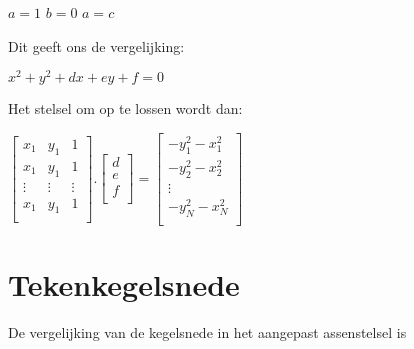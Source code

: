 \documentclass[]{article}
\begin{document}
 \begin{center}
 $ a = 1$	   \quad \quad \quad      	$b = 0$    \quad \quad \quad   	$a = c$
 \end{center}
 
 \noindent Dit geeft ons de vergelijking:
 
 \begin{center}
  $x^2 + y^2 + dx +  ey + f = 0$
  \end{center}
  
  \noindent Het stelsel om op te lossen wordt dan:
   
   \begin{center}
   $
   \begin{bmatrix}
    x_{1} & y_{1} & 1 \\
    x_{1} & y_{1} & 1 \\
   \vdots & \vdots & \vdots \\
    x_{1} & y_{1} & 1 \\
   \end{bmatrix}
   .
    \begin{bmatrix}
    d\\
    e\\
    f\\
    \end{bmatrix}
    =
     \begin{bmatrix}
      -y^2_1-x^2_1\\
      -y^2_2-x^2_2\\
      \vdots\\
      -y^2_N-x^2_N\\
      \end{bmatrix}
      $
       \end{center}
 
 
 
 \section*{Tekenkegelsnede}
 
 De vergelijking van de kegelsnede in het aangepast assenstelsel is 
 
\end{document}
